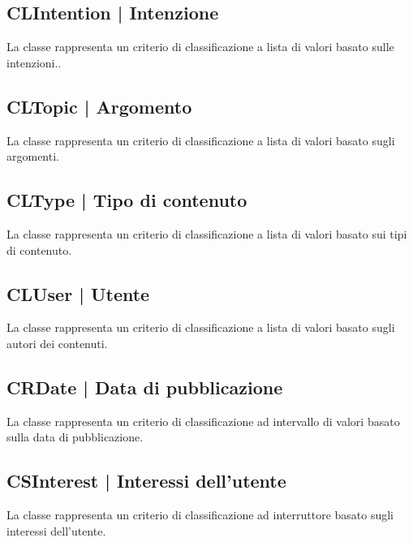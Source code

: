 \documentclass[10pt,a4paper,headinclude,footinclude,hidelinks]{scrreprt} %
\begin{document}
	\subsection[CLIntention]{CLIntention | Intenzione}
	\label{sec:stage:design:model.criteria:intention}
	La classe \textit{} rappresenta un criterio di classificazione a lista di valori basato sulle intenzioni..

	\subsection[CLTopic]{CLTopic | Argomento}
	\label{sec:stage:design:model.criteria:topic}
	La classe \textit{} rappresenta un criterio di classificazione a lista di valori basato sugli argomenti.

	\subsection[CLType]{CLType | Tipo di contenuto}
	\label{sec:stage:design:model.criteria:type}
	La classe \textit{} rappresenta un criterio di classificazione a lista di valori basato sui tipi di contenuto.

	\subsection[CLUser]{CLUser | Utente}
	\label{sec:stage:design:model.criteria:user}
	La classe \textit{} rappresenta un criterio di classificazione a lista di valori basato sugli autori dei contenuti.

	\subsection[CRDate]{CRDate | Data di pubblicazione}
	\label{sec:stage:design:model.criteria:publication-date}
	La classe \textit{} rappresenta un criterio di classificazione ad intervallo di valori basato sulla data di pubblicazione.

	\subsection[CSInterest]{CSInterest | Interessi dell'utente}
	\label{sec:stage:design:model.criteria:interest}
	La classe \textit{} rappresenta un criterio di classificazione ad interruttore basato sugli interessi dell'utente.
\end{document}
